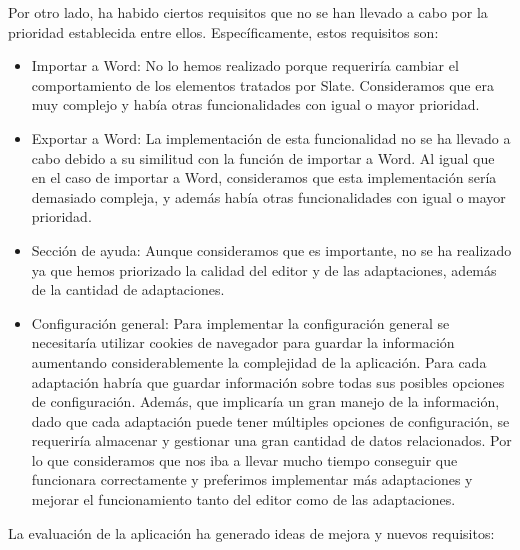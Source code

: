 Por otro lado, ha habido ciertos requisitos que no se han llevado a cabo por la prioridad establecida entre ellos. Específicamente, estos requisitos son:
\begin{itemize}
    \item Importar a Word: No lo hemos realizado porque requeriría cambiar el comportamiento de los elementos tratados por Slate. Consideramos que era muy complejo y había otras funcionalidades con igual o mayor prioridad.
    \item Exportar a Word: La implementación de esta funcionalidad no se ha llevado a cabo debido a su similitud con la función de importar a Word. Al igual que en el caso de importar a Word, consideramos que esta implementación sería demasiado compleja, y además había otras funcionalidades con igual o mayor prioridad. 
    \item Sección de ayuda: Aunque consideramos que es importante, no se ha realizado ya que hemos priorizado la calidad del editor y de las adaptaciones, además de la cantidad de adaptaciones.
    \item Configuración general: Para implementar la configuración general se necesitaría utilizar cookies de navegador para guardar la información aumentando considerablemente la complejidad de la aplicación. Para cada adaptación habría que guardar información sobre todas sus posibles opciones de configuración. Además, que implicaría un gran manejo de la información, dado que cada adaptación puede tener múltiples opciones de configuración, se requeriría almacenar y gestionar una gran cantidad de datos relacionados. Por lo que consideramos que nos iba a llevar mucho tiempo conseguir que funcionara correctamente y preferimos implementar más adaptaciones y mejorar el funcionamiento tanto del editor como de las adaptaciones.
\end{itemize}

La evaluación de la aplicación ha generado ideas de mejora y nuevos requisitos:

